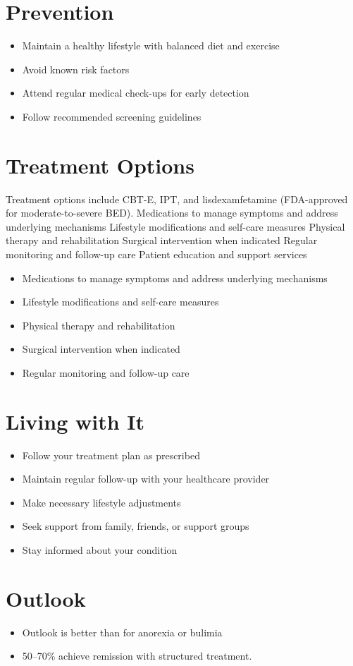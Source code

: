 \section{Prevention}
\begin{itemize}[noitemsep]
  \item Maintain a healthy lifestyle with balanced diet and exercise
  \item Avoid known risk factors
  \item Attend regular medical check-ups for early detection
  \item Follow recommended screening guidelines
\end{itemize}
\section{Treatment Options}
Treatment options include CBT-E, IPT, and lisdexamfetamine (FDA-approved for moderate-to-severe BED). Medications to manage symptoms and address underlying mechanisms Lifestyle modifications and self-care measures Physical therapy and rehabilitation Surgical intervention when indicated Regular monitoring and follow-up care Patient education and support services

\begin{itemize}[noitemsep]
  \item Medications to manage symptoms and address underlying mechanisms
  \item Lifestyle modifications and self-care measures
  \item Physical therapy and rehabilitation
  \item Surgical intervention when indicated
  \item Regular monitoring and follow-up care
\end{itemize}
\section{Living with It}
\begin{itemize}[noitemsep]
  \item Follow your treatment plan as prescribed
  \item Maintain regular follow-up with your healthcare provider
  \item Make necessary lifestyle adjustments
  \item Seek support from family, friends, or support groups
  \item Stay informed about your condition
\end{itemize}
\section{Outlook}
\begin{itemize}[noitemsep]
  \item Outlook is better than for anorexia or bulimia
  \item 50--70\% achieve remission with structured treatment.
\end{itemize}
